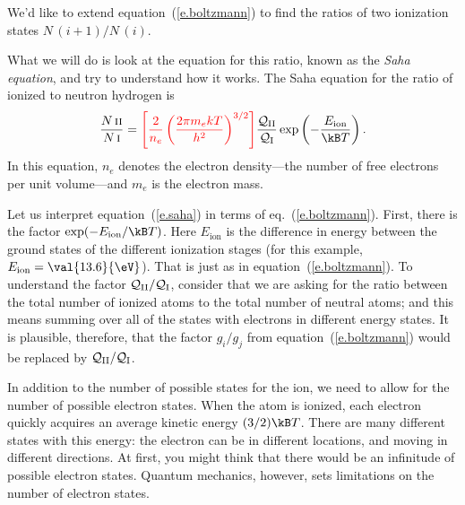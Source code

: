 We'd like to extend equation~(\ref{e.boltzmann}) to find the ratios of two ionization states $N\,(i+1)/N\,(i)$.  


What we will do is look at the equation for this ratio, known as the \emph{Saha equation}, and try to understand how it works.  The Saha equation for the ratio of ionized to neutron hydrogen is
\begin{equation}\label{e.saha}
\frac{N\,\textrm{\scshape ii}}{N\,\textrm{\scshape i}} 
= {\color{red}\left[\frac{2}{n_{e}}
\left(\frac{2\pi m_{e}kT}{h^{2}}\right)^{3/2}\right]}
\frac{\pfcn_{\mathrm{II}}}{\pfcn_{\mathrm{I}}} \exp\left(-\frac{E_{\mathrm{ion}}}{\kB T}\right).
\end{equation}
In this equation, $n_{e}$ denotes the electron density---the number of free electrons per unit volume---and $m_{e}$ is the electron mass.

Let us interpret equation~(\ref{e.saha}) in terms of eq.~(\ref{e.boltzmann}).  First, there is the factor $\exp(-E_{\mathrm{ion}}/\kB T)$. Here $E_{\mathrm{ion}}$ is the difference in energy between the ground states of the different ionization stages (for this example, $E_{\mathrm{ion}} = \val{13.6}{\eV}$).  That is just as in equation~(\ref{e.boltzmann}). To understand the factor $\mathcal{Q}_{\mathrm{II}}/\mathcal{Q}_{\mathrm{I}}$, consider that we are asking for the ratio between the total number of ionized atoms to the total number of neutral atoms; and this means summing over all of the states with electrons in different energy states. It is plausible, therefore, that the factor $g_{i}/g_{j}$ from equation~(\ref{e.boltzmann}) would be replaced by $\mathcal{Q}_{\mathrm{II}}/\mathcal{Q}_{\mathrm{I}}$.

In addition to the number of possible states for the ion, we need to allow for the number of possible electron states.  When the atom is ionized, each electron quickly acquires an average kinetic energy $(3/2)\kB T$. There are many different states with this energy: the electron can be in different locations, and moving in different directions.  At first, you might think that there would be an infinitude of possible electron states.  Quantum mechanics, however, sets limitations on the number of electron states.


